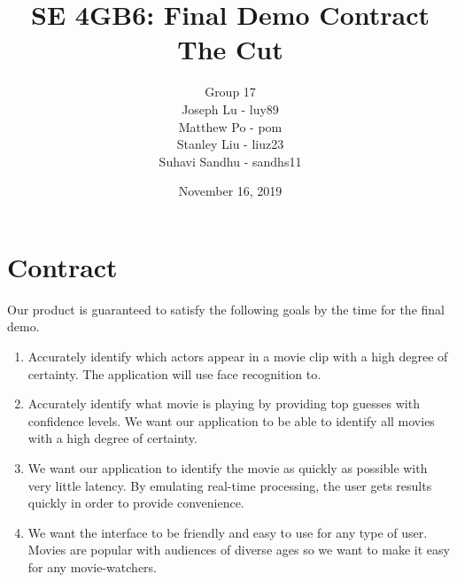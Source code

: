 \documentclass[12pt, titlepage]{article}
\title{SE 4GB6: Final Demo Contract\\ The Cut}
\author{Group 17
		\\ Joseph Lu - luy89
		\\ Matthew Po - pom
		\\ Stanley Liu - liuz23
		\\ Suhavi Sandhu - sandhs11
}
\date{November 16, 2019}
\begin{document}
\maketitle	
\newpage

\section{Contract}
    Our product is guaranteed to satisfy the following goals by the time for the final demo.
\begin{enumerate}
    \item Accurately identify which actors appear in a movie clip with a high degree of certainty. The application will use face recognition to.
	\item Accurately identify what movie is playing by providing top guesses with confidence levels. We want our application to be able to identify all movies with a high degree of certainty.
	\item We want our application to identify the movie as quickly as possible with very little latency. By emulating real-time processing, the user gets results quickly in order to provide convenience.
	\item We want the interface to be friendly and easy to use for any type of user. Movies are popular with audiences of diverse ages so we want to make it easy for any movie-watchers.
\end{enumerate}

\end{document}
